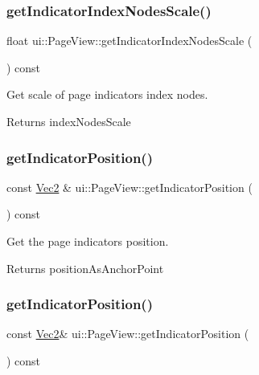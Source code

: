 \subsubsection{\texorpdfstring{get\+Indicator\+Index\+Nodes\+Scale()}{getIndicatorIndexNodesScale()}\hspace{0.1cm}{\footnotesize\ttfamily [2/2]}}
{\footnotesize\ttfamily float ui\+::\+Page\+View\+::get\+Indicator\+Index\+Nodes\+Scale (\begin{DoxyParamCaption}{ }\end{DoxyParamCaption}) const}



Get scale of page indicator\textquotesingle{}s index nodes. 

\begin{DoxyReturn}{Returns}
index\+Nodes\+Scale 
\end{DoxyReturn}
\mbox{\label{classui_1_1PageView_a7fec50e1db1bfe9583564ccf528c4865}} 
\subsubsection{\texorpdfstring{get\+Indicator\+Position()}{getIndicatorPosition()}\hspace{0.1cm}{\footnotesize\ttfamily [1/2]}}
{\footnotesize\ttfamily const \hyperlink{classVec2}{Vec2} \& ui\+::\+Page\+View\+::get\+Indicator\+Position (\begin{DoxyParamCaption}{ }\end{DoxyParamCaption}) const}



Get the page indicator\textquotesingle{}s position. 

\begin{DoxyReturn}{Returns}
position\+As\+Anchor\+Point 
\end{DoxyReturn}
\mbox{\label{classui_1_1PageView_a0b8e1469c924aa6c7980790f786eae60}} 
\subsubsection{\texorpdfstring{get\+Indicator\+Position()}{getIndicatorPosition()}\hspace{0.1cm}{\footnotesize\ttfamily [2/2]}}
{\footnotesize\ttfamily const \hyperlink{classVec2}{Vec2}\& ui\+::\+Page\+View\+::get\+Indicator\+Position (\begin{DoxyParamCaption}{ }\end{DoxyParamCaption}) const}



